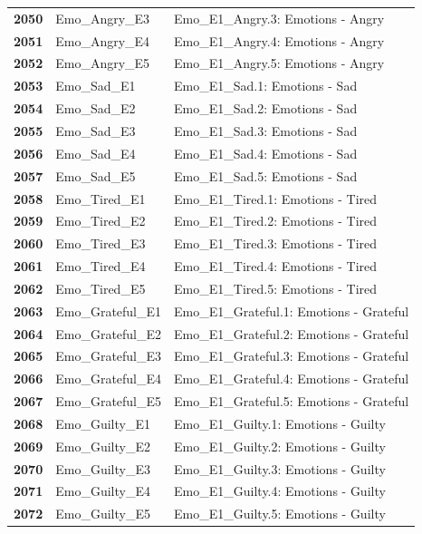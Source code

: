 \documentclass[
  letterpaper,
  DIV=11,
  numbers=noendperiod]{scrartcl}
\begin{document}
\begin{longtable}[t]{>{}cll}
\textbf{2050} & Emo\_Angry\_E3 & Emo\_E1\_Angry.3: Emotions - Angry\\
\addlinespace
\textbf{2051} & Emo\_Angry\_E4 & Emo\_E1\_Angry.4: Emotions - Angry\\
\textbf{2052} & Emo\_Angry\_E5 & Emo\_E1\_Angry.5: Emotions - Angry\\
\textbf{2053} & Emo\_Sad\_E1 & Emo\_E1\_Sad.1: Emotions - Sad\\
\textbf{2054} & Emo\_Sad\_E2 & Emo\_E1\_Sad.2: Emotions - Sad\\
\textbf{2055} & Emo\_Sad\_E3 & Emo\_E1\_Sad.3: Emotions - Sad\\
\addlinespace
\textbf{2056} & Emo\_Sad\_E4 & Emo\_E1\_Sad.4: Emotions - Sad\\
\textbf{2057} & Emo\_Sad\_E5 & Emo\_E1\_Sad.5: Emotions - Sad\\
\textbf{2058} & Emo\_Tired\_E1 & Emo\_E1\_Tired.1: Emotions - Tired\\
\textbf{2059} & Emo\_Tired\_E2 & Emo\_E1\_Tired.2: Emotions - Tired\\
\textbf{2060} & Emo\_Tired\_E3 & Emo\_E1\_Tired.3: Emotions - Tired\\
\addlinespace
\textbf{2061} & Emo\_Tired\_E4 & Emo\_E1\_Tired.4: Emotions - Tired\\
\textbf{2062} & Emo\_Tired\_E5 & Emo\_E1\_Tired.5: Emotions - Tired\\
\textbf{2063} & Emo\_Grateful\_E1 & Emo\_E1\_Grateful.1: Emotions - Grateful\\
\textbf{2064} & Emo\_Grateful\_E2 & Emo\_E1\_Grateful.2: Emotions - Grateful\\
\textbf{2065} & Emo\_Grateful\_E3 & Emo\_E1\_Grateful.3: Emotions - Grateful\\
\addlinespace
\textbf{2066} & Emo\_Grateful\_E4 & Emo\_E1\_Grateful.4: Emotions - Grateful\\
\textbf{2067} & Emo\_Grateful\_E5 & Emo\_E1\_Grateful.5: Emotions - Grateful\\
\textbf{2068} & Emo\_Guilty\_E1 & Emo\_E1\_Guilty.1: Emotions - Guilty\\
\textbf{2069} & Emo\_Guilty\_E2 & Emo\_E1\_Guilty.2: Emotions - Guilty\\
\textbf{2070} & Emo\_Guilty\_E3 & Emo\_E1\_Guilty.3: Emotions - Guilty\\
\addlinespace
\textbf{2071} & Emo\_Guilty\_E4 & Emo\_E1\_Guilty.4: Emotions - Guilty\\
\textbf{2072} & Emo\_Guilty\_E5 & Emo\_E1\_Guilty.5: Emotions - Guilty\\

\end{longtable}
\end{document}

